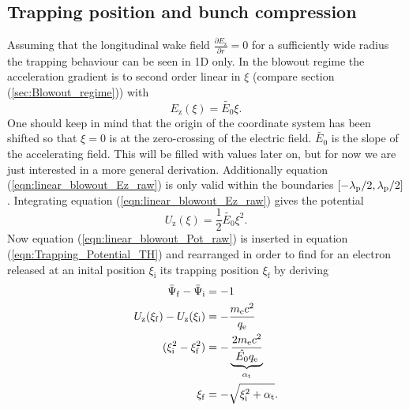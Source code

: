 \subsection{Trapping position and bunch compression}
\label{sec:Trap_pos_bunch_comp}
Assuming that the longitudinal wake field 
$\frac{\partial E_\mathrm{z}}{\partial r} = 0 $ for a sufficiently wide radius the trapping behaviour can be seen in 1D only.
In the blowout regime the acceleration gradient is to second order linear in $\xi$ (compare section (\ref{sec:Blowout_regime})) with
\begin{equation}
\label{eqn:linear_blowout_Ez_raw}
E_\mathrm{z}(\xi)=\tilde{E_0}\xi.
\end{equation}
One should keep in mind that the origin of the coordinate system has been shifted so that $\xi=0$ is at the zero-crossing of the electric field. $\tilde{E_0}$ is the slope of the accelerating field. This will be filled with values later on, but for now we are just interested in a more general derivation. Additionally equation (\ref{eqn:linear_blowout_Ez_raw}) is only valid within the boundaries $[-\lambda_\mathrm{p}/2,\lambda_\mathrm{p}/2]$.
Integrating equation (\ref{eqn:linear_blowout_Ez_raw}) gives the potential
\begin{equation}
\label{eqn:linear_blowout_Pot_raw}
U_\mathrm{z}(\xi)=\frac{1}{2}\tilde{E_0}\xi^2.
\end{equation}
Now equation (\ref{eqn:linear_blowout_Pot_raw}) is inserted in equation (\ref{eqn:Trapping_Potential_TH}) and rearranged in order to find for an electron released at an inital position $\xi_\mathrm{i}$ its trapping position $\xi_\mathrm{f}$ by deriving
\begin{align}
\bar{\Psi}_\mathrm{f}-\bar{\Psi}_\mathrm{i}&=-1\\
U_\mathrm{z}(\xi_\mathrm{f})-U_\mathrm{z}(\xi_\mathrm{i})&=-\frac{m_\mathrm{e} c^2}{q_\mathrm{e}}\\
(\xi_\mathrm{i}^2-\xi_\mathrm{f}^2)&=-\underbrace{\frac{2m_\mathrm{e} c^2}{\hat{E_0}q_\mathrm{e}}}_{\alpha_\mathrm{t}}\\
\label{eqn:Trapping_Position}
\xi_\mathrm{f}&=-\sqrt{\xi_\mathrm{i}^2+\alpha_\mathrm{t}}.
\end{align}

